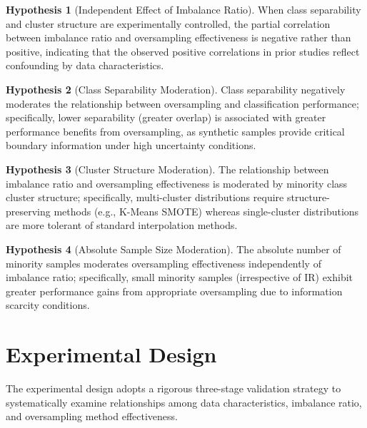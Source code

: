 \documentclass[12pt,a4paper]{article}
\theoremstyle{definition}
\newtheorem{hypothesis}{Hypothesis}
\begin{document}
\begin{hypothesis}[Independent Effect of Imbalance Ratio]
When class separability and cluster structure are experimentally controlled, the partial correlation between imbalance ratio and oversampling effectiveness is negative rather than positive, indicating that the observed positive correlations in prior studies reflect confounding by data characteristics.
\label{hyp:h1}
\end{hypothesis}

\begin{hypothesis}[Class Separability Moderation]
Class separability negatively moderates the relationship between oversampling and classification performance; specifically, lower separability (greater overlap) is associated with greater performance benefits from oversampling, as synthetic samples provide critical boundary information under high uncertainty conditions.
\label{hyp:h2}
\end{hypothesis}

\begin{hypothesis}[Cluster Structure Moderation]
The relationship between imbalance ratio and oversampling effectiveness is moderated by minority class cluster structure; specifically, multi-cluster distributions require structure-preserving methods (e.g., K-Means SMOTE) whereas single-cluster distributions are more tolerant of standard interpolation methods.
\label{hyp:h3}
\end{hypothesis}

\begin{hypothesis}[Absolute Sample Size Moderation]
The absolute number of minority samples moderates oversampling effectiveness independently of imbalance ratio; specifically, small minority samples (irrespective of IR) exhibit greater performance gains from appropriate oversampling due to information scarcity conditions.
\label{hyp:h4}
\end{hypothesis}

\section{Experimental Design}
\indent The experimental design adopts a rigorous three-stage validation strategy to systematically examine relationships among data characteristics, imbalance ratio, and oversampling method effectiveness.
\end{document}
